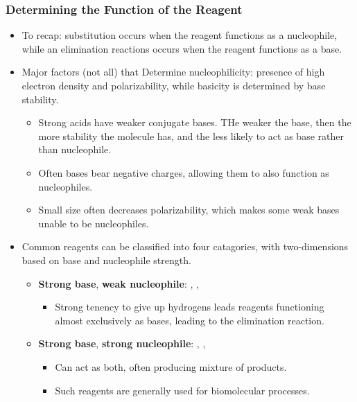 \documentclass[12pt,a4paper]{article}
\begin{document}
\begin{itemize}
    \subsubsection{Determining the Function of the Reagent}
    \begin{itemize}
        \item To recap: substitution occurs when the reagent functions as a nucleophile, while an elimination reactions occurs when the reagent functions as a base.
        \item Major factors (not all) that Determine nucleophilicity: presence of high electron density and polarizability, while basicity is determined by base stability.
            \begin{itemize}
                \item Strong acids have weaker conjugate bases. THe weaker the base, then the more stability the molecule has, and the less likely to act as base rather than nucleophile.
                \item Often bases bear negative charges, allowing them to also function as nucleophiles.
                \item Small size often decreases polarizability, which makes some weak bases unable to be nucleophiles.
            \end{itemize}
        \item Common reagents can be classified into four catagories, with two-dimensions based on base and nucleophile strength.
            \begin{itemize}
                \item \textbf{Strong base}, {\color{darklc}\textbf{weak nucleophile}}: , , 
                \begin{itemize}
                    \item Strong tenency to give up hydrogens leads reagents functioning almost exclusively as bases, leading to the elimination reaction.
                \end{itemize}
                \item \textbf{Strong base}, \textbf{strong nucleophile}: {\color{neg}}, {\color{neg}}, {\color{neg}}\begin{itemize}
                    \item Can act as both, often producing mixture of products.
                    \item Such reagents are generally used for biomolecular processes.
                \end{itemize}

\end{itemize}
\end{itemize}
\end{itemize}
\end{document}
